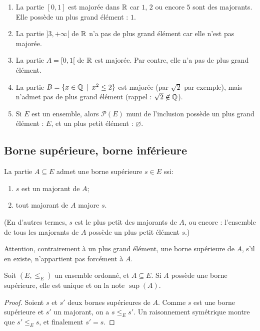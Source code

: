 \begin{exemples}
\begin{enumerate}[label=\alph*)]
\item  La partie $[0,1]$ est majorée dans $\mathbb{R}$ car $1$, $2$ ou encore $5$ sont des majorants. Elle possède un plus grand élément : $1$.
\item La partie $]3,+\infty[$ de $\mathbb{R}$ n'a pas de plus grand élément car elle n'est pas majorée.
\item La partie $A=[0,1[$ de $\mathbb{R}$ est majorée. Par contre, elle n'a pas de plus grand élément. 
\item La partie $B=\{x\in \mathbb{Q}\:\mid\: x^2\leq 2\}$ est majorée (par $\sqrt2$ par exemple), mais n'admet pas de plus grand élément (rappel : $\sqrt 2 \not\in\mathbb{Q}$).
\item Si $E$ est un ensemble, alors $\mathcal P(E)$ muni de l'inclusion possède un plus grand élément : $E$, et un plus petit élément : $\varnothing$.
\end{enumerate}
\end{exemples}

\subsection{Borne supérieure, borne inférieure}

\begin{definition}
 La partie $A\subseteq E$ admet une borne supérieure $s\in E$ ssi:
\begin{enumerate}
\item $s$ est un majorant de $A$;
\item tout majorant de $A$ majore $s$.
\end{enumerate}
(En d'autres termes, $s$ est le plus petit des majorants de $A$, ou encore : l'ensemble de tous les majorants de $A$ possède un plus petit élément $s$.)
\end{definition}

Attention, contrairement à un plus grand élément, une  borne supérieure de $A$, s'il en existe, n'appartient pas forcément à $A$. 

\begin{proposition}
Soit $(E,\leq_E)$ un ensemble ordonné, et $A\subseteq E$. Si $A$ possède une borne supérieure, elle est unique et on la note $\sup(A)$.
\end{proposition}
\begin{proof}
Soient $s$ et $s'$ deux bornes supérieures de $A$. Comme $s$ est une borne supérieure et $s'$ un majorant, on a $s\leq_E s'$. Un raisonnement symétrique montre que  $s'\leq_E s$, et finalement $s'=s$.
\end{proof}

